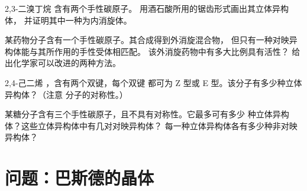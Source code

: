 \begin{exercise}[$\star\star\star$]\label{exo:g12:stereochemistry:12}
2,3-二溴丁烷  含有两个手性碳原子。
用酒石酸所用的锯齿形式画出其立体异构体，
并证明其中一种为内消旋体。
\end{exercise}

\begin{exercise}[$\star\star\star$]\label{exo:g12:stereochemistry:13}
某药物分子含有一个手性碳原子。其合成得到外消旋混合物，
但只有一种对映异构体能与其所作用的手性受体相匹配。
该外消旋药物中有多大比例具有活性？
给出化学家可以改进的两种方法。
\end{exercise}

\begin{exercise}[$\star\star\star$]\label{exo:g12:stereochemistry:14}
2,4-己二烯 ，含有两个双键，每个双键
都可为 Z 型或 E 型。该分子有多少种立体异构体？（注意
分子的对称性。）
\end{exercise}

\begin{exercise}[$\star\star\star$]\label{exo:g12:stereochemistry:15}
某糖分子含有三个手性碳原子，且不具有对称性。它最多可有多少
种立体异构体？这些立体异构体中有几对对映异构体？
每一种立体异构体各有多少种非对映异构体？
\end{exercise}

\section{问题：巴斯德的晶体}



